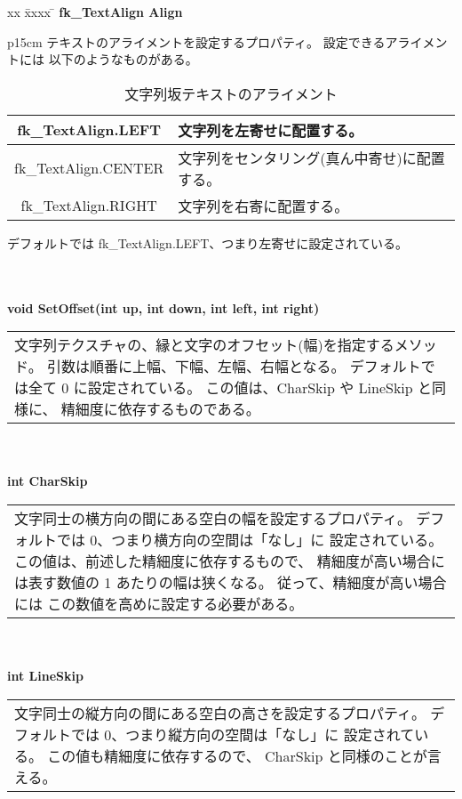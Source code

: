 \begin{tabbing}
xx \= xxxx \= \kill
\> \textbf{fk\_TextAlign Align} \\
	\> \> \begin{tabular}{p{15cm}}
		テキストのアライメントを設定するプロパティ。
		設定できるアライメントには
		以下のようなものがある。
			\begin{table}[H]
			\caption{文字列坂テキストのアライメント}
			\label{tbl:textAlign}
			\begin{center}
			\begin{tabular}{|c|l|}
			\hline
			fk\_TextAlign.LEFT & 文字列を左寄せに配置する。\\ \hline
			fk\_TextAlign.CENTER &
			文字列をセンタリング(真ん中寄せ)に配置する。\\ \hline
			fk\_TextAlign.RIGHT & 文字列を右寄に配置する。\\ \hline
			\end{tabular}
			\end{center}
			\end{table}
		デフォルトでは fk\_TextAlign.LEFT、つまり左寄せに設定されている。
	\end{tabular} \\ \\

\> \textbf{void SetOffset(int up, int down, int left, int right)} \\
	\> \> \begin{tabular}{p{15cm}}
		文字列テクスチャの、縁と文字のオフセット(幅)を指定するメソッド。
		引数は順番に上幅、下幅、左幅、右幅となる。
		デフォルトでは全て 0 に設定されている。
		この値は、CharSkip や LineSkip と同様に、
		精細度に依存するものである。
	\end{tabular} \\ \\

\> \textbf{int CharSkip} \\
	\> \> \begin{tabular}{p{15cm}}
		文字同士の横方向の間にある空白の幅を設定するプロパティ。
		デフォルトでは 0、つまり横方向の空間は「なし」に
		設定されている。
		この値は、前述した精細度に依存するもので、
		精細度が高い場合には表す数値の 1 あたりの幅は狭くなる。
		従って、精細度が高い場合には
		この数値を高めに設定する必要がある。
	\end{tabular} \\ \\

\> \textbf{int LineSkip} \\
	\> \> \begin{tabular}{p{15cm}}
		文字同士の縦方向の間にある空白の高さを設定するプロパティ。
		デフォルトでは 0、つまり縦方向の空間は「なし」に
		設定されている。
		この値も精細度に依存するので、
		CharSkip と同様のことが言える。
	\end{tabular} \\ \\


\end{tabbing}
